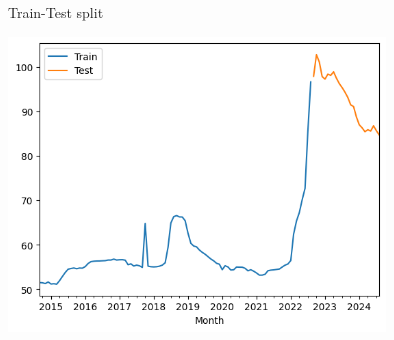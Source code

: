 \documentclass[12pt, aspectratio=169]{beamer}
\begin{document}
\begin{frame}{Train-Test split}
    \begin{center}
        \includegraphics[width = 0.75\textwidth,height = .75\textheight]{split.png}
    \end{center}
\end{frame}
\end{document}
